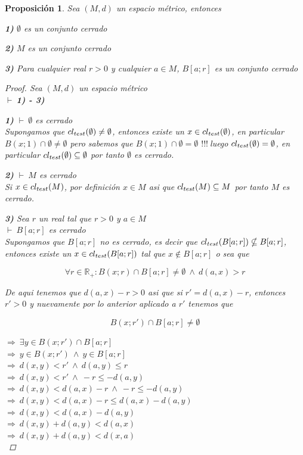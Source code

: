\documentclass[oneside]{book} %
\theoremstyle{Teorema}
\newtheorem{Proposicion}[Definicion]{Proposición}
\theoremstyle{Ejemplos}
\theoremstyle{[Obs]}
\def \test {test}
\newcommand{\cerradura}[2][\test]{\ifx \test #1 {\overline{#2}} \else {cl_{#1}(#2)} \fi} %
\renewcommand{\{}{\left\lbrace} %
\renewcommand{\}}{\right\rbrace} %
\newcommand{\y}{\ \wedge\ } %
\newcommand{\n}{\cap} %
\renewcommand{\sc}{\subseteq} %
\newcommand{\R}{\mathbb{R}} %
\newcommand{\pd}{$\vdash\ $} %
\renewcommand{\c}{$!!!\ $} %
\newcommand{\Imp}{$\Rightarrow\ $} %
\begin{document}
			\begin{Proposicion}\setlength{\parindent}{0em}
				
				Sea $(M, d)$ un espacio métrico, entonces

				\textbf{1)} $\emptyset$ es un conjunto cerrado

				\textbf{2)} $M$ es un conjunto cerrado

				\textbf{3)} Para cualquier real $r > 0$ y cualquier $a \in M$, $B[a;r]$ es un conjunto cerrado

				\begin{proof}
					
					Sea $(M, d)$ un espacio métrico \\ 
					\pd \textbf{1) - 3)} 

					\textbf{1)} \pd $\emptyset$ es cerrado \\ 
					Supongamos que $\cerradura{\emptyset} \neq \emptyset$, entonces existe un $x \in \cerradura{\emptyset}$, en particular $B(x;1) \n \emptyset \neq \emptyset$ pero sabemos que $B(x;1) \n \emptyset = \emptyset$ \c luego $\cerradura{\emptyset} = \emptyset$, en particular $\cerradura{\emptyset} \sc \emptyset$ por tanto $\emptyset$ es cerrado.

					\textbf{2)} \pd $M$ es cerrado \\ 
					Si $x \in \cerradura{M}$, por definición $x \in M$ asi que $\cerradura{M} \sc M$ por tanto $M$ es cerrado. 

					\textbf{3)} Sea $r$ un real tal que $r > 0$ y $a \in M$ \\ 
					\pd $B[a;r]$ es cerrado \\ 
					Supongamos que $B[a;r]$ no es cerrado, es decir que $\cerradura{B[a;r]} \nsubseteq B[a;r]$, entonces existe un $x \in \cerradura{B[a;r]}$ tal que $x \notin B[a;r]$ o sea que 
					
					\[ \forall r \in \R_{+} : B(x;r) \n B[a;r] \neq \emptyset \y d(a,x) > r \]   

					De aqui tenemos que $d(a, x) - r > 0$ asi que si $r' = d(a, x) - r$, entonces $r' > 0$ y nuevamente por lo anterior aplicado a $r'$ tenemos que  

					\[ B(x;r') \n B[a;r] \neq \emptyset \] 
					
					\Imp $\exists y \in B(x;r') \n B[a;r]$ \\ 
					\Imp $y \in B(x;r') \y y \in B[a;r]$ \\ 
					\Imp $d(x, y) < r' \y d(a, y) \leq r$ \\ 
					\Imp $d(x, y) < r' \y -r \leq -d(a, y)$ \\ 
					\Imp $d(x, y) < d(a, x) - r \y -r \leq -d(a, y)$ \\ 
					\Imp $d(x, y) < d(a, x) - r \leq d(a, x) - d(a, y)$ \\ 
					\Imp $d(x, y) < d(a, x) - d(a, y)$ \\ 
					\Imp $d(x, y) + d(a, y) < d(a, x)$ \\ 
					\Imp $d(x, y) + d(a, y) < d(x, a)$ \\ 


\end{proof}
\end{Proposicion}
\end{document}
